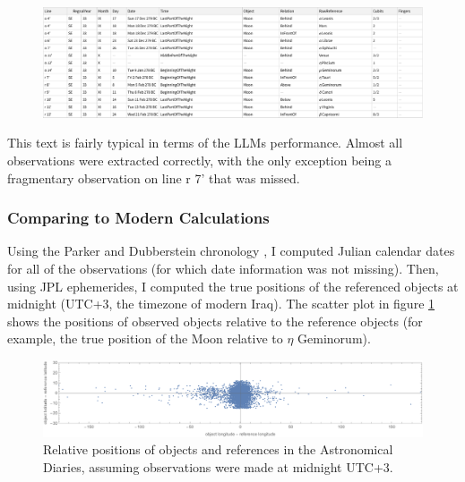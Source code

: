 \documentclass{article}
\begin{document}
\begin{figure}[h]
    \includegraphics[width=1\linewidth]{X102782.pdf}
\end{figure}

This text is fairly typical in terms of the LLMs performance. Almost all observations were extracted correctly, with the only exception being a fragmentary observation on line r 7' that was missed.



\subsubsection{Comparing to Modern Calculations}
Using the Parker and Dubberstein chronology \autocite{parkerDubberstein}, I computed Julian calendar dates for all of the observations (for which date information was not missing). Then, using JPL ephemerides, I computed the true positions of the referenced objects at midnight (UTC+3, the timezone of modern Iraq). The scatter plot in figure \ref{fig:scatter} shows the positions of observed objects relative to the reference objects (for example, the true position of the Moon relative to $\eta$ Geminorum).

\begin{figure}[h]
    \centering
    \includegraphics[width=\linewidth]{relativePositions.pdf}
    \caption{Relative positions of objects and references in the Astronomical Diaries, assuming observations were made at midnight UTC+3.}
    \label{fig:scatter}
\end{figure}
\end{document}
